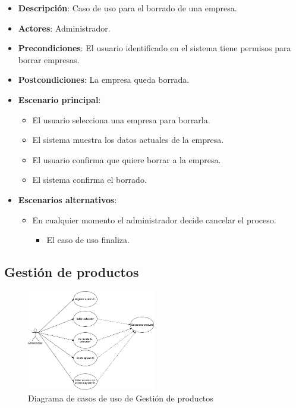 \documentclass[12pt,a4paperpaper,]{report}
\providecommand{\tightlist}{%
  \setlength{\itemsep}{0pt}\setlength{\parskip}{0pt}}
\begin{document}
\begin{itemize}
\tightlist
\item
  \textbf{Descripción}: Caso de uso para el borrado de una empresa.
\item
  \textbf{Actores}: Administrador.
\item
  \textbf{Precondiciones}: El usuario identificado en el sistema tiene
  permisos para borrar empresas.
\item
  \textbf{Postcondiciones}: La empresa queda borrada.
\item
  \textbf{Escenario principal}:

  \begin{itemize}
  \tightlist
  \item
    El usuario selecciona una empresa para borrarla.
  \item
    El sistema muestra los datos actuales de la empresa.
  \item
    El usuario confirma que quiere borrar a la empresa.
  \item
    El sistema confirma el borrado.
  \end{itemize}
\item
  \textbf{Escenarios alternativos}:

  \begin{itemize}
  \tightlist
  \item
    En cualquier momento el administrador decide cancelar el proceso.

    \begin{itemize}
    \tightlist
    \item
      El caso de uso finaliza.
    \end{itemize}
  \end{itemize}
\end{itemize}

\subsection{Gestión de productos}\label{gestiuxf3n-de-productos}

\begin{figure}
\centering
\includegraphics[width=0.50000\textwidth]{source/figures/gestion-productos.png}
\caption{Diagrama de casos de uso de Gestión de productos
\label{gestion_productos}}
\end{figure}
\end{document}
